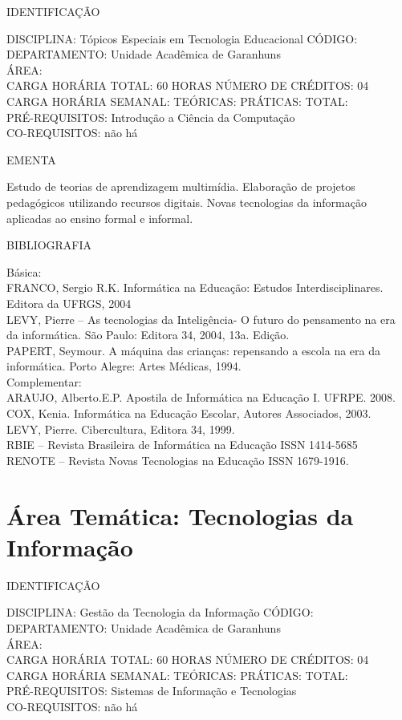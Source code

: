 \documentclass[
	12pt,				%
	openright,			%
  oneside,     %
	a4paper,			%
	chapter=TITLE,		%
	english,			%
	french,				%
	spanish,			%
	brazil				%
	]{abntex2}
\begin{document}
\begin{apendicesenv}
\newpage IDENTIFICAÇÃO

DISCIPLINA: Tópicos Especiais em Tecnologia Educacional CÓDIGO:\\ 
DEPARTAMENTO: Unidade Acadêmica de Garanhuns\\ 
ÁREA: \\
CARGA HORÁRIA TOTAL: 60 HORAS NÚMERO DE CRÉDITOS: 04\\
CARGA HORÁRIA SEMANAL: TEÓRICAS: PRÁTICAS: TOTAL: \\
PRÉ-REQUISITOS: Introdução a Ciência da Computação\\
CO-REQUISITOS: não há

EMENTA 

Estudo de teorias de aprendizagem multimídia. Elaboração de projetos
pedagógicos utilizando recursos digitais. Novas tecnologias da
informação aplicadas ao ensino formal e informal.

BIBLIOGRAFIA 

Básica:\\
FRANCO, Sergio R.K. Informática na Educação: Estudos Interdisciplinares.
Editora da UFRGS, 2004\\
LEVY, Pierre -- As tecnologias da Inteligência- O futuro do pensamento
na era da informática. São Paulo: Editora 34, 2004, 13a. Edição.\\
PAPERT, Seymour. A máquina das crianças: repensando a escola na era da
informática. Porto Alegre: Artes Médicas, 1994.\\
Complementar:\\
ARAUJO, Alberto.E.P. Apostila de Informática na Educação I. UFRPE.
2008.\\
COX, Kenia. Informática na Educação Escolar, Autores Associados, 2003.\\
LEVY, Pierre. Cibercultura, Editora 34, 1999.\\
RBIE -- Revista Brasileira de Informática na Educação ISSN 1414-5685\\
RENOTE -- Revista Novas Tecnologias na Educação ISSN 1679-1916.
\newpage

\section*{Área Temática: Tecnologias da Informação}

IDENTIFICAÇÃO

DISCIPLINA: Gestão da Tecnologia da Informação CÓDIGO:\\ 
DEPARTAMENTO: Unidade Acadêmica de Garanhuns\\
ÁREA: \\
CARGA HORÁRIA TOTAL: 60 HORAS NÚMERO DE CRÉDITOS: 04\\
CARGA HORÁRIA SEMANAL: TEÓRICAS: PRÁTICAS: TOTAL: \\
PRÉ-REQUISITOS: Sistemas de Informação e Tecnologias\\
CO-REQUISITOS: não há


\end{apendicesenv}
\end{document}
